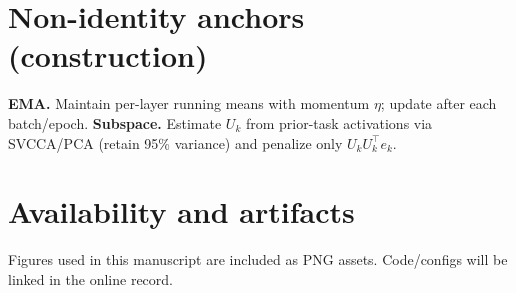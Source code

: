 \documentclass[11pt]{article}
\begin{document}
\section{Non-identity anchors (construction)}
\textbf{EMA.} Maintain per-layer running means with momentum $\eta$; update after each batch/epoch. \textbf{Subspace.} Estimate $U_k$ from prior-task activations via SVCCA/PCA (retain 95\% variance) and penalize only $U_kU_k^\top e_k$.

\section*{Availability and artifacts}
Figures used in this manuscript are included as PNG assets. Code/configs will be linked in the online record.
\end{document}
